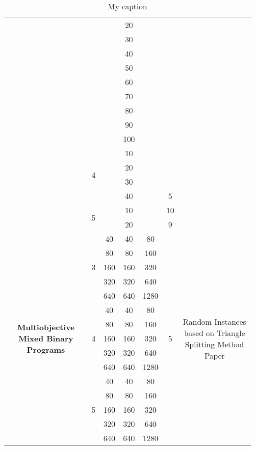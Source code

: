 \begin{table}[]
{\begin{tabular}{|c|c|c|c|c|c|c|}
 &  &  & 20 &  &  &  \\ \cline{4-4}
 &  &  & 30 &  &  &  \\ \cline{4-4}
 &  &  & 40 &  &  &  \\ \cline{4-4}
 &  &  & 50 &  &  &  \\ \cline{4-4}
 &  &  & 60 &  &  &  \\ \cline{4-4}
 &  &  & 70 &  &  &  \\ \cline{4-4}
 &  &  & 80 &  &  &  \\ \cline{4-4}
 &  &  & 90 &  &  &  \\ \cline{4-4}
 &  &  & 100 &  &  &  \\ \cline{2-2} \cline{4-4}
 & \multirow{4}{*}{4} &  & 10 &  &  &  \\ \cline{4-4}
 &  &  & 20 &  &  &  \\ \cline{4-4}
 &  &  & 30 &  &  &  \\ \cline{4-4} \cline{6-6}
 &  &  & 40 &  & 5 &  \\ \cline{2-2} \cline{4-4} \cline{6-6}
 & \multirow{2}{*}{5} &  & 10 &  & 10 &  \\ \cline{4-4} \cline{6-6}
 &  &  & 20 &  & 9 &  \\ \hline
\multirow{15}{*}{\textbf{Multiobjective Mixed Binary Programs}} & \multirow{5}{*}{3} & 40 & 40 & 80 & \multirow{15}{*}{5} & \multirow{15}{*}{Random Instances based on Triangle Splitting Method Paper} \\ \cline{3-5}
 &  & 80 & 80 & 160 &  &  \\ \cline{3-5}
 &  & 160 & 160 & 320 &  &  \\ \cline{3-5}
 &  & 320 & 320 & 640 &  &  \\ \cline{3-5}
 &  & 640 & 640 & 1280 &  &  \\ \cline{2-5}
 & \multirow{5}{*}{4} & 40 & 40 & 80 &  &  \\ \cline{3-5}
 &  & 80 & 80 & 160 &  &  \\ \cline{3-5}
 &  & 160 & 160 & 320 &  &  \\ \cline{3-5}
 &  & 320 & 320 & 640 &  &  \\ \cline{3-5}
 &  & 640 & 640 & 1280 &  &  \\ \cline{2-5}
 & \multirow{5}{*}{5} & 40 & 40 & 80 &  &  \\ \cline{3-5}
 &  & 80 & 80 & 160 &  &  \\ \cline{3-5}
 &  & 160 & 160 & 320 &  &  \\ \cline{3-5}
 &  & 320 & 320 & 640 &  &  \\ \cline{3-5}
 &  & 640 & 640 & 1280 &  &  \\ \hline
\end{tabular}%
}
\caption{My caption}
\label{my-label}
\end{table}
